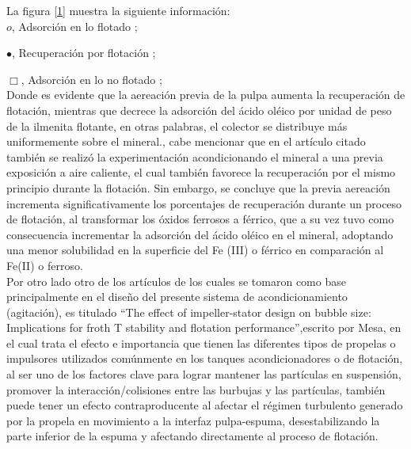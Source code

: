 \documentclass[11pt,letter
								]
								{article}
\begin{document}
La figura \ref{1}  muestra la siguiente información:\\

$o$, Adsorción en lo flotado   ;

 $\bullet $, Recuperación por flotación  ; 

 $\Box $, Adsorción en lo no flotado ;\\


Donde es evidente que la aereación previa de la pulpa aumenta la recuperación de flotación, mientras que decrece la adsorción del ácido oléico por unidad de peso de la ilmenita flotante, en otras palabras, el colector se distribuye más uniformemente sobre el mineral.\cite{art1}, cabe mencionar que  en el artículo citado también se realizó la  experimentación acondicionando el  mineral a una previa exposición a aire caliente, el cual también favorece la recuperación por el mismo principio  durante la flotación. Sin embargo, se concluye que la previa aereación incrementa significativamente los porcentajes de recuperación durante un proceso de flotación, al transformar los óxidos ferrosos a férrico, que a su vez tuvo como consecuencia incrementar la adsorción del ácido oléico en el mineral, adoptando una menor solubilidad en la superficie  del Fe (III) o férrico en comparación al Fe(II) o ferroso. \cite{art1}\\






Por otro lado otro de los artículos de los cuales se tomaron como base principalmente en el diseño del presente sistema de acondicionamiento (agitación), es titulado ``The effect of impeller-stator design on bubble size: Implications for froth T stability and flotation performance'',escrito por Mesa\cite{Art2}, en el cual trata el efecto e importancia que tienen las diferentes tipos de propelas o impulsores utilizados comúnmente en los tanques acondicionadores o de flotación, al ser uno de los factores clave para lograr mantener las partículas en suspensión,  promover la interacción/colisiones  entre las burbujas y las  partículas, también puede tener un efecto contraproducente al afectar el régimen turbulento generado por la propela en movimiento a la interfaz pulpa-espuma, desestabilizando la parte inferior de la espuma y afectando directamente al proceso de flotación.\\
\end{document}
